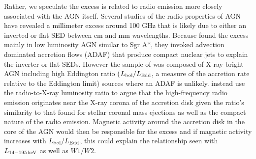 Rather, we speculate the excess is related to radio emission more closely associated with the AGN itself. Several studies of the radio properties of AGN have revealed a millimeter excess around 100 GHz \citep{Doi:2005wj, Doi:2011si, Behar:2015le, Scharwachter:2015ez} that is likely due to either an inverted or flat SED between cm and mm wavelengths. Because \citet{Doi:2011si} found the excess mainly in low luminosity AGN similar to Sgr A*, they invoked advection dominated accretion flows (ADAF) that produce compact nuclear jets to explain the inverter or flat SEDs. However the sample of \citet{Behar:2015le} was composed of X-ray bright AGN including high Eddington ratio ($L_{\rm bol}/L_{\rm Edd}$, a measure of the accretion rate relative to the Eddington limit) sources where an ADAF is unlikely. \citet{Behar:2015le} instead use the radio-to-X-ray luminosity ratio to argue that the high-frequency radio emission originates near the X-ray corona of the accretion disk given the ratio's similarity to that found for stellar coronal mass ejections \citep[e.g][]{Bastian:1998tx} as well as the compact nature of the radio emission. Magnetic activity around the accretion disk in the core of the AGN would then be responsible for the excess and if magnetic activity increases with $L_{\rm bol}/L_{\rm Edd}$, this could explain the relationship seen with $L_{\rm 14-195\,keV}$ as well as $W1/W2$. 
  
  
  